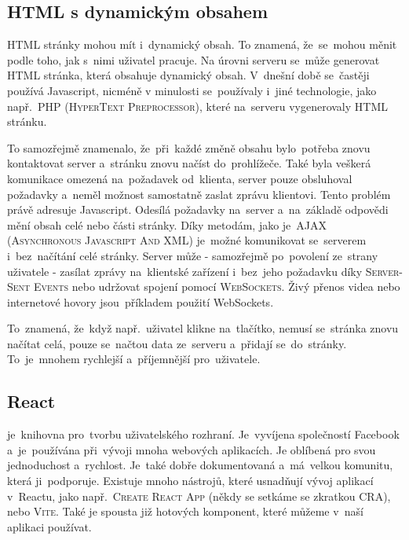\documentclass[14pt,a4paper]{article}
\begin{document}
        \subsection{HTML s dynamickým obsahem}
        HTML stránky mohou mít i~dynamický obsah. To znamená, že~se~mohou měnit podle toho, jak s~nimi uživatel pracuje.
        Na úrovni serveru se~může generovat HTML stránka, která obsahuje dynamický obsah. V~dnešní době se~častěji používá Javascript,
        nicméně v minulosti se~používaly i~jiné technologie, jako např.~\textsc{PHP (HyperText Preprocessor)}, které na~serveru vygenerovaly HTML stránku.

        To samozřejmě znamenalo, že~při~každé změně obsahu bylo~potřeba znovu kontaktovat server a~stránku znovu načíst do~prohlížeče. Také byla veškerá komunikace omezená na~požadavek od~klienta, server pouze obsluhoval požadavky a~neměl možnost samostatně zaslat zprávu klientovi.
        Tento problém právě adresuje Javascript. Odesílá požadavky na~server a~na~základě odpovědi mění obsah celé nebo části stránky. Díky metodám, jako je~\textsc{AJAX (Asynchronous Javascript And XML)}\parencite{ajax:mdn} je~možné komunikovat se~serverem i~bez~načítání celé stránky.
        Server může - samozřejmě po~povolení ze~strany uživatele - zasílat zprávy na~klientské zařízení i~bez~jeho požadavku díky \textsc{Server-Sent Events}\parencite{sse:mdn} nebo udržovat spojení pomocí \textsc{WebSockets}\parencite{websocket:mdn}. Živý přenos videa nebo internetové hovory jsou~příkladem použití WebSockets.

        To~znamená, že~když např.~uživatel klikne na~tlačítko, nemusí se~stránka znovu načítat celá, pouze se~načtou data ze~serveru
        a~přidají se~do~stránky. To~je~mnohem rychlejší a~příjemnější pro~uživatele.

        

        \subsection{React} je~knihovna pro~tvorbu uživatelského rozhraní. Je~vyvíjena společností Facebook a~je~používána při~vývoji mnoha webových aplikacích.
        Je oblíbená pro svou jednoduchost a~rychlost. Je~také dobře dokumentovaná a~má~velkou komunitu, která ji~podporuje.
        Existuje mnoho nástrojů, které usnadňují vývoj aplikací v~Reactu, jako
        např.~\textsc{Create React App} (někdy se setkáme se zkratkou CRA), nebo \textsc{Vite}.
        Také je spousta již hotových komponent, které můžeme v~naší aplikaci používat.
\end{document}
